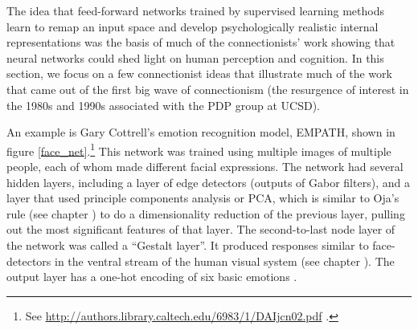 The idea that feed-forward networks trained by supervised learning methods learn to remap an input space and develop  psychologically realistic internal representations was the basis of much of the connectionists' work showing that neural networks could shed light on human perception and cognition. In this section, we focus on a few connectionist ideas that illustrate much of the work that came out of the first big wave of connectionism (the resurgence of interest in the 1980s and 1990s associated with the PDP group at UCSD). 


An example is Gary Cottrell's  emotion recognition model, EMPATH, shown in figure \ref{face_net}.\footnote{See \url{http://authors.library.caltech.edu/6983/1/DAIjcn02.pdf} \cite{dailey2002empath}.} This network was trained using multiple images of multiple people, each of whom made different facial expressions. The network had several hidden layers, including a layer of edge detectors (outputs of Gabor filters), and a layer that used principle components analysis or PCA, which is similar to Oja's rule (see chapter ) to do a dimensionality reduction of the previous layer, pulling out the most significant features of that layer. The second-to-last node layer of the network was called a ``Gestalt layer''. It produced responses similar to face-detectors in the ventral stream of the human visual system  (see chapter ). The output layer has a one-hot encoding of six basic emotions \cite{dailey2002empath}. 


